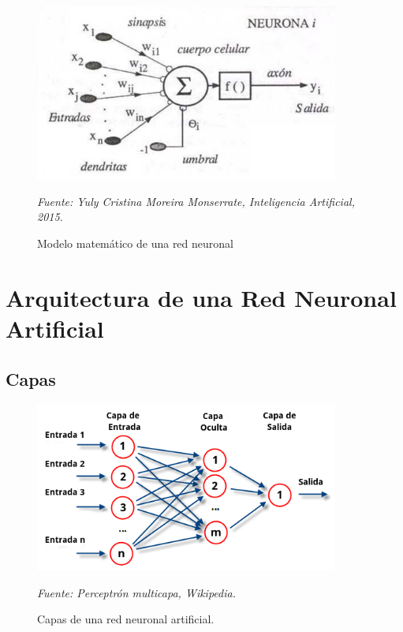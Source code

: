\begin{figure}[H]
		\centering
		\includegraphics[width=100mm]{Imagenes/neurona_artificial.png}
		\caption{Modelo matemático de una red neuronal}
		\vspace{0.15cm}
		\textit{Fuente: Yuly Cristina Moreira Monserrate, Inteligencia Artificial, 2015.}
		\label{fig:neurona_artificial}
\end{figure}




\section{Arquitectura de una Red Neuronal Artificial}
\subsection{Capas}

\begin{figure}[H]
		\centering
		\includegraphics[width=100mm]{Imagenes/capas_red_neuronal.png}
		\caption{Capas de una red neuronal artificial.}
		\vspace{0.15cm}
		\textit{Fuente: Perceptrón multicapa, Wikipedia.}
		\label{fig:capa_red_neuronal}
\end{figure} 

